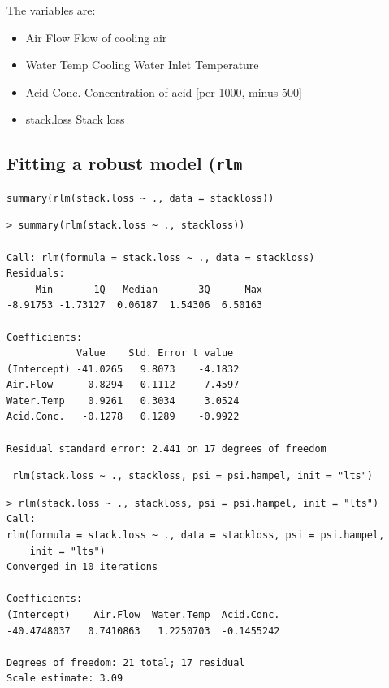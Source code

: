 \documentclass[12pt, a4paper]{article}
\theoremstyle{plain}
\theoremstyle{definition}
\theoremstyle{remark}
\begin{document}
The variables are: 
\begin{itemize}
\item	Air Flow	 Flow of cooling air
\item	Water Temp	 Cooling Water Inlet Temperature
\item	Acid Conc.	 Concentration of acid [per 1000, minus 500]
\item	stack.loss	 Stack loss
\end{itemize}

\subsection{Fitting a robust model (\texttt{rlm}}
\begin{framed}
\begin{verbatim}
summary(rlm(stack.loss ~ ., data = stackloss))
\end{verbatim}
\end{framed}
\begin{verbatim}
> summary(rlm(stack.loss ~ ., stackloss))

Call: rlm(formula = stack.loss ~ ., data = stackloss)
Residuals:
     Min       1Q   Median       3Q      Max 
-8.91753 -1.73127  0.06187  1.54306  6.50163 

Coefficients:
            Value    Std. Error t value 
(Intercept) -41.0265   9.8073    -4.1832
Air.Flow      0.8294   0.1112     7.4597
Water.Temp    0.9261   0.3034     3.0524
Acid.Conc.   -0.1278   0.1289    -0.9922

Residual standard error: 2.441 on 17 degrees of freedom
\end{verbatim}
\begin{framed}
\begin{verbatim}
 rlm(stack.loss ~ ., stackloss, psi = psi.hampel, init = "lts")
\end{verbatim}
\end{framed}
\begin{verbatim}
> rlm(stack.loss ~ ., stackloss, psi = psi.hampel, init = "lts")
Call:
rlm(formula = stack.loss ~ ., data = stackloss, psi = psi.hampel, 
    init = "lts")
Converged in 10 iterations

Coefficients:
(Intercept)    Air.Flow  Water.Temp  Acid.Conc. 
-40.4748037   0.7410863   1.2250703  -0.1455242 

Degrees of freedom: 21 total; 17 residual
Scale estimate: 3.09 
\end{verbatim}
\end{document}
